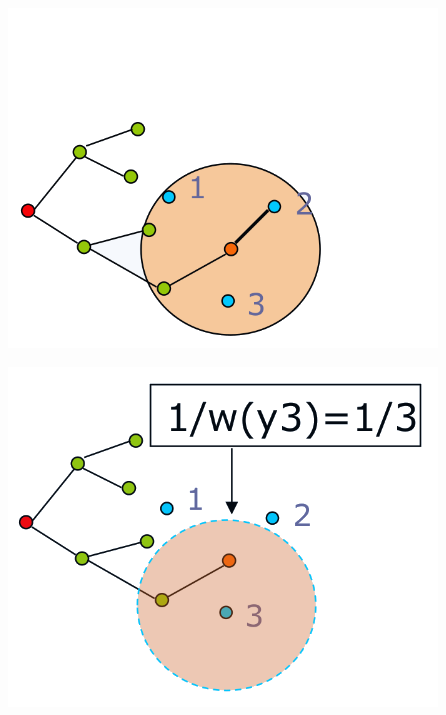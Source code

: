 \begin{multicols*}{2}
\begin{minipage}[t]{.5\columnwidth}
	\raggedright
	\includegraphics[width=\columnwidth]{weighted_expansion_2.png}
\end{minipage}%
\begin{minipage}[t]{.5\columnwidth}
	\raggedleft
	\includegraphics[width=\columnwidth]{weighted_expansion_1.png}
\end{minipage}



\end{multicols*}
